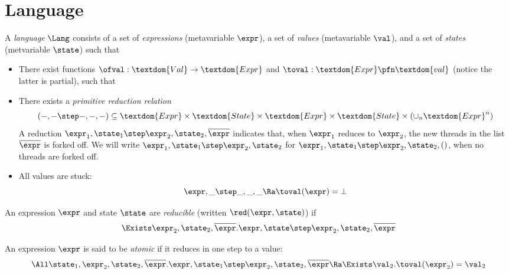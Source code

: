 \let\bar\overline

\section{Language}
\label{sec:language}

A \emph{language} $\Lang$ consists of a set  of \emph{expressions} (metavariable $\expr$), a set  of \emph{values} (metavariable $\val$), and a set  of \emph{states} (metvariable $\state$) such that
\begin{itemize}
\item There exist functions $\ofval : \textdom{Val} \to \textdom{Expr}$ and $\toval : \textdom{Expr} \pfn \textdom{val}$ (notice the latter is partial), such that
\item There exists a \emph{primitive reduction relation} \[(-,- \step -,-,-) \subseteq \textdom{Expr} \times \textdom{State} \times \textdom{Expr} \times \textdom{State} \times (\cup_n \textdom{Expr}^n)\]
  A reduction $\expr_1, \state_1 \step \expr_2, \state_2, \overline\expr$ indicates that, when $\expr_1$ reduces to $\expr_2$, the new threads in the list $\overline\expr$ is forked off.
  We will write $\expr_1, \state_1 \step \expr_2, \state_2$ for $\expr_1, \state_1 \step \expr_2, \state_2, ()$, \ie when no threads are forked off. \\
\item All values are stuck:
\[ \expr, \_ \step  \_, \_, \_ \Ra \toval(\expr) = \bot \]
\end{itemize}

\begin{defn}
  An expression $\expr$ and state $\state$ are \emph{reducible} (written $\red(\expr, \state)$) if
  \[ \Exists \expr_2, \state_2, \bar\expr. \expr,\state \step \expr_2,\state_2,\bar\expr \]
\end{defn}

\begin{defn}
  An expression $\expr$ is said to be \emph{atomic} if it reduces in one step to a value:
  \[ \All\state_1, \expr_2, \state_2, \bar\expr. \expr, \state_1 \step \expr_2, \state_2, \bar\expr \Ra \Exists \val_2. \toval(\expr_2) = \val_2 \]
\end{defn}

